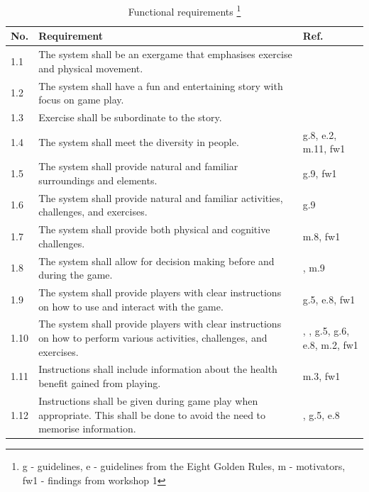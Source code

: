 \begin{minipage}{12 cm}
\begin{table} [H]
\centering
\begin{tabular}{|>{\raggedright}p{}|p{}|p{}|}
\hline
\textbf{No.} & \textbf{Requirement} &  \textbf{Ref.}\\ \hline
1.1 & The system shall be an exergame that emphasises exercise and physical movement. & \cite{project} \\ \hline
1.2 & The system shall have a fun and entertaining story with focus on game play.  & \cite{project} \cite{zyda2005visual} \\ \hline
1.3 & Exercise shall be subordinate to the story. & \cite{zyda2005visual} \\ \hline
1.4 & The system shall meet the diversity in people. & g.8, e.2, m.11, fw1 \\ \hline
1.5 & The system shall provide natural and familiar surroundings and elements. & g.9, fw1\\ \hline
1.6 & The system shall provide natural and familiar activities, challenges, and exercises. & g.9 \\ \hline
1.7 & The system shall provide both physical and cognitive challenges. & m.8, fw1 \\ \hline
1.8 & The system shall allow for decision making before and during the game. & \cite{understandingvg}, m.9 \\ \hline
1.9 & The system shall provide players with clear instructions on how to use and interact with the game. & g.5, e.8, fw1 \\ \hline
1.10 & The system shall provide players with clear instructions on how to perform various activities, challenges, and exercises. & \cite{sweetser}, \cite{project}, g.5, g.6, e.8, m.2, fw1\\ \hline
1.11 & Instructions shall include information about the health benefit gained from playing. & m.3, fw1\\ \hline
1.12 & Instructions shall be given during game play when appropriate. This shall be done to avoid the need to memorise information. & \cite{sweetser}, g.5, e.8 \\ \hline
    \end{tabular}
    \caption[Functional requirements, part 1]{Functional requirements \footnote{g - guidelines, e - guidelines from the Eight Golden Rules, m - motivators, fw1 - findings from workshop 1}}
    \label{tab:func1}
\end{table} 
\end{minipage}

